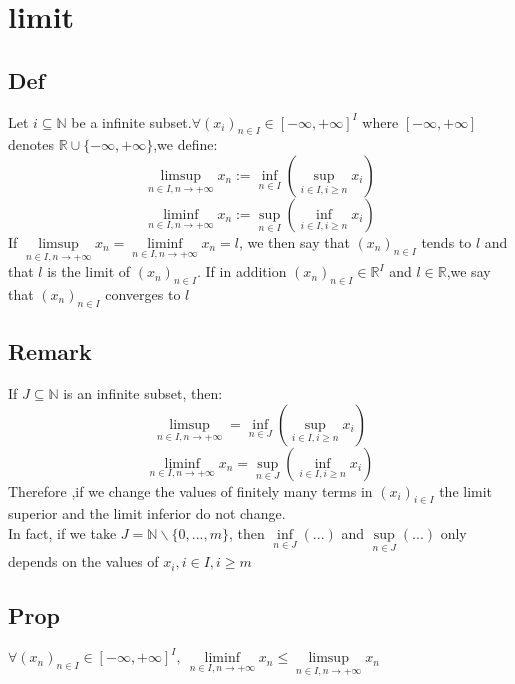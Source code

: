 \documentclass{book}
\begin{document}
\section{limit}
\subsection{Def}
Let $i\subseteq\mathbb{N}$ be a infinite subset.$\forall (x_i)_{n\in I}\in [-\infty,+\infty]^I$ where $[-\infty,+\infty]$ denotes $\mathbb{R}\cup\{-\infty,+\infty\}$,we define:
$$\limsup\limits_{n\in I,n\rightarrow +\infty}x_n:=\inf\limits_{n\in I}(\sup\limits_{i\in I,i\geq n}x_i)$$
$$\liminf\limits_{n\in I,n\rightarrow +\infty}x_n:=\sup\limits_{n\in I}(\inf\limits_{i\in I,i\geq n}x_i)$$
If $\limsup\limits_{n\in I,n\rightarrow +\infty}x_n=\liminf\limits_{n\in I,n\rightarrow +\infty}x_n=l$, we then say that $(x_n)_{n\in I}$ tends to $l$ and that $l$ is the limit of $(x_n)_{n\in I}$. If in addition $(x_n)_{n\in I}\in \mathbb{R}^I$ and $l\in \mathbb{R}$,we say that $(x_n)_{n\in I}$ converges to $l$
\subsection{Remark}
If $J\subseteq\mathbb{N}$ is an infinite subset, then: $$\limsup\limits_{n\in I,n\rightarrow +\infty}=\inf\limits_{n\in J}(\sup\limits_{i\in I,i\geq n}x_i)$$
$$\liminf\limits_{n\in I,n\rightarrow +\infty}x_n=\sup\limits_{n\in J}(\inf\limits_{i\in I,i\geq n}x_i)$$
Therefore ,if we change the values of finitely many terms in $(x_i)_{i\in I}$ the limit superior and the limit inferior do not change.\\
In fact, if we take $J=\mathbb{N}\backslash\{0,...,m\}$, then $\inf\limits_{n\in J}(...)$ and $\sup\limits_{n\in J}(...)$ only depends on the values of $x_i,i\in I,i\geq m$
\subsection{Prop}
$\forall (x_n)_{n\in I}\in [-\infty,+\infty]^I,\ \liminf\limits_{n\in I,n\rightarrow+\infty}x_n\leq\limsup\limits_{n\in I,n\rightarrow+\infty}x_n$
\end{document}
